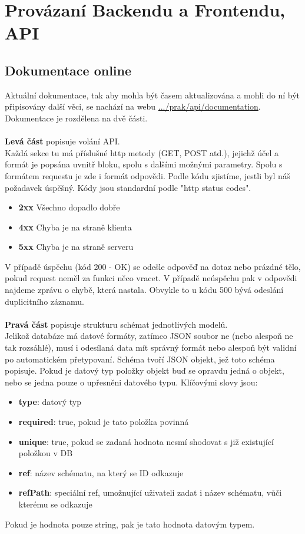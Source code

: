\chapter{Provázaní Backendu a Frontendu, API}

\section{Dokumentace online}
Aktuální dokumentace, tak aby mohla být časem aktualizována a mohli do ní
být připisovány další věci, se nachází na webu
\href{http://quest.ms.mff.cuni.cz/prak/api/documentation}{.../prak/api/documentation}.
\\
Dokumentace je rozdělena na dvě části.
\\
\\
\textbf{Levá část} popisuje volání API.\\
Každá sekce tu má příslušné http metody (GET, POST atd.),
jejichž účel a formát je popsána uvnitř bloku, spolu s dalšími možnými parametry.
Spolu s formátem requestu je zde i formát odpovědi.
Podle kódu zjistíme, jestli byl náš požadavek úspěšný.
Kódy jsou standardní podle "http status codes".
\begin{itemize}
	\item \textbf{2xx} Všechno dopadlo dobře
	\item \textbf{4xx} Chyba je na straně klienta
	\item \textbf{5xx} Chyba je na straně serveru
\end{itemize}
V případě úspěchu (kód 200 - OK) se odešle odpověď na dotaz nebo
prázdné tělo, pokud request neměl za funkci něco vracet.
V případě neúspěchu pak v odpovědi najdeme zprávu o chybě, která nastala.
Obvykle to u kódu 500 bývá odeslání duplicitního záznamu.
\\
\\
\textbf{Pravá část} popisuje strukturu schémat jednotlivých modelů.\\
Jelikož databáze má datové formáty, zatímco JSON soubor ne (nebo alespoň ne tak rozsáhlé),
musí i odesílaná data mít správný formát nebo alespoň být validní po automatickém
přetypovaní.
Schéma tvoří JSON objekt, jež toto schéma popisuje.
Pokud je datový typ položky objekt buď se opravdu jedná o objekt, nebo
se jedna pouze o upřesněni datového typu.
Klíčovými slovy jsou:
\begin{itemize}
	\item \textbf{type}: datový typ
	\item \textbf{required}: true, pokud je tato položka povinná
	\item \textbf{unique}: true, pokud se zadaná hodnota nesmí shodovat s již existující položkou v DB
	\item \textbf{ref}: název schématu, na který se ID odkazuje
	\item \textbf{refPath}: speciální ref, umožnující uživateli zadat i název schématu, vůči kterému se odkazuje
\end{itemize}
Pokud je hodnota pouze string, pak je tato hodnota datovým typem.

